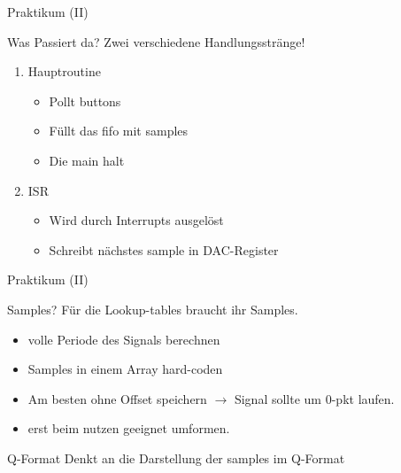 
  \begin{frame} {Praktikum (II)}
    \begin{block} {Was Passiert da?}
      Zwei verschiedene Handlungsstränge!
      \begin{enumerate}
        \item Hauptroutine
              \begin{itemize}
                \item Pollt buttons
                \item Füllt das fifo mit samples
                \item Die main halt
              \end{itemize}
        \item ISR
              \begin{itemize}
                \item Wird durch Interrupts ausgelöst
                \item Schreibt nächstes sample in DAC-Register
              \end{itemize}
      \end{enumerate}
    \end{block}
  \end{frame}


  \begin{frame} {Praktikum (II)}
    \begin{block} {Samples?}
      Für die Lookup-tables braucht ihr Samples.
      \begin{itemize}
        \item volle Periode des Signals berechnen
        \item Samples in einem Array hard-coden
        \item Am besten ohne Offset speichern $\rightarrow$ Signal sollte um 0-pkt laufen.
        \item erst beim nutzen geeignet umformen.
      \end{itemize}
    \end{block}
    \begin{alertblock} {Q-Format}
      Denkt an die Darstellung der samples im Q-Format
    \end{alertblock}
  \end{frame}

